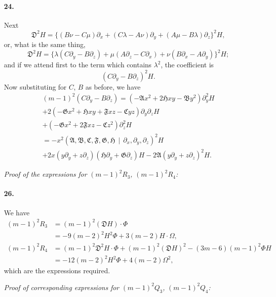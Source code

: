 \documentclass[12pt,a4paper]{article}
\theoremstyle{plain}
\begin{document}
\newpage

\paragraph{24.}
Next
\[
\mathfrak{D}^2 H = \{(B\nu - C\mu)\partial_x + (C\lambda - A\nu)\partial_y + (A\mu - B\lambda)\partial_z\}^2 H,
\]
or,  what  is  the  same  thing,
\[
\mathfrak{D}^2 H = \{\lambda(C\partial_y - B\partial_z) + \mu(A\partial_z - C\partial_x) + \nu(B\partial_x - A\partial_y)\}^2 H;
\]
and  if  we  attend  first  to  the  term  which  contains  $\lambda^2$,  the  coefficient  is
\[
(C\partial_y - B\partial_z)^2 H.
\]
Now  substituting  for  $C$,  $B$  as  before,  we  have
\begin{multline*}
(m-1)^2 (C\partial_y - B\partial_z) = (-\mathfrak{A}x^2 + 2\mathfrak{H}xy - \mathfrak{B}y^2)\partial_y^2 H \\
+ 2(-\mathfrak{G}x^2 + \mathfrak{H}xy + \mathfrak{F}xz - \mathfrak{C}yz)\partial_y \partial_z H \\
+ (-\mathfrak{G}x^2 + 2\mathfrak{F}xz - \mathfrak{C}z^2)\partial_z^2 H \\
= -x^2 (\mathfrak{A}, \mathfrak{B}, \mathfrak{C}, \mathfrak{F}, \mathfrak{G}, \mathfrak{H} \,\!\!\mid\, \partial_x, \partial_y, \partial_z)^2 H \\
+ 2x(y\partial_y + z\partial_z)(\mathfrak{H}\partial_y + \mathfrak{G}\partial_z)H - 2\mathfrak{A}(y\partial_y + z\partial_z)^2 H.
\end{multline*}


\newpage

\noindent\textit{Proof of the expressions for $(m-1)^2 R_3$, $(m-1)^2 R_4$:}

\paragraph{26.}
We  have
\begin{align*}
(m-1)^2 R_3 &= (m-1)^2 (\mathfrak{D} H) \cdot \Phi \\
&= -9(m-2)^2 H^2 \Phi + 3(m-2)H \cdot \Omega, \\
(m-1)^2 R_4 &= (m-1)^2 \mathfrak{D}^2 H \cdot \Phi + (m-1)^2 (\mathfrak{D} H)^2 - (3m-6)(m-1)^2 \Phi H \\
&= -12(m-2)^2 H^2 \Phi + 4(m-2) \Omega^2,
\end{align*}
which  are  the  expressions  required.

\noindent\textit{Proof  of  corresponding  expressions  for  $(m-1)^2 Q_3$,  $(m-1)^2 Q_4$:}
\end{document}
